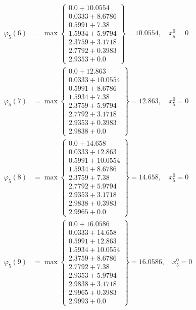 \documentclass{article}
\begin{document}
\begin{align*}
  
  
  
\varphi_{5}(6) &= \max \left\{ \begin{array}{c}
0.0 + 10.0554 \\
 0.0333 + 8.6786 \\
 0.5991 + 7.38 \\
 1.5934 + 5.9794 \\
 2.3759 + 3.1718 \\
 2.7792 + 0.3983 \\
 2.9353 + 0.0
\end{array} \right\}=10.0554,\quad x_{5}^0=0\\
  
  
  
  
\varphi_{5}(7) &= \max \left\{ \begin{array}{c}
0.0 + 12.863 \\
 0.0333 + 10.0554 \\
 0.5991 + 8.6786 \\
 1.5934 + 7.38 \\
 2.3759 + 5.9794 \\
 2.7792 + 3.1718 \\
 2.9353 + 0.3983 \\
 2.9838 + 0.0
\end{array} \right\}=12.863,\quad x_{5}^0=0\\
  
  
  
  
\varphi_{5}(8) &= \max \left\{ \begin{array}{c}
0.0 + 14.658 \\
 0.0333 + 12.863 \\
 0.5991 + 10.0554 \\
 1.5934 + 8.6786 \\
 2.3759 + 7.38 \\
 2.7792 + 5.9794 \\
 2.9353 + 3.1718 \\
 2.9838 + 0.3983 \\
 2.9965 + 0.0
\end{array} \right\}=14.658,\quad x_{5}^0=0\\
  
  
  
  
\varphi_{5}(9) &= \max \left\{ \begin{array}{c}
0.0 + 16.0586 \\
 0.0333 + 14.658 \\
 0.5991 + 12.863 \\
 1.5934 + 10.0554 \\
 2.3759 + 8.6786 \\
 2.7792 + 7.38 \\
 2.9353 + 5.9794 \\
 2.9838 + 3.1718 \\
 2.9965 + 0.3983 \\
 2.9993 + 0.0
\end{array} \right\}=16.0586,\quad x_{5}^0=0\\
  

\end{align*}
\end{document}
